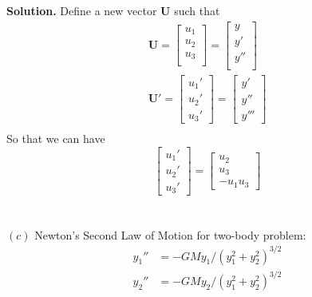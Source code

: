 \textbf{Solution.} Define a new vector $\mathbf{U}$ such that
\begin{align*}
\mathbf{U} = 
\begin{bmatrix}
u_1\\
u_2\\
u_3\\
\end{bmatrix}
=
\begin{bmatrix}
y\\
y'\\
y''\\
\end{bmatrix}\\
\mathbf{U'} =
\begin{bmatrix}
u_1'\\
u_2'\\
u_3'
\end{bmatrix} =
\begin{bmatrix}
y'\\
y''\\
y'''
\end{bmatrix}\\
\end{align*}
So that we can have
\begin{equation*}\boxed{
	\begin{bmatrix}
	u_1'\\
	u_2'\\
	u_3'
	\end{bmatrix} =
	\begin{bmatrix}
	u_2\\
	u_3\\
	-u_1u_3
	\end{bmatrix}}
\end{equation*}
\\
\\
$(c)$ Newton's Second Law of Motion for two-body problem:
\begin{align*}
y_1'' &= -GMy_1/\left(y_1^2+y_2^2\right)^{3/2}\\
y_2'' &= -GMy_2/\left(y_1^2+y_2^2\right)^{3/2}
\end{align*}

